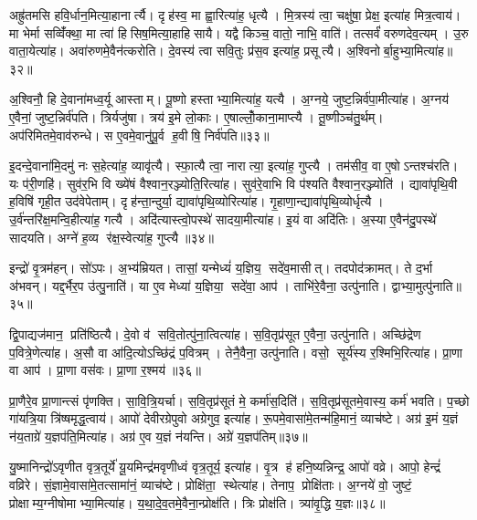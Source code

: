 अह्रु॑तमसि हवि॒र्धान॒मित्या॒हानार्त्यै। दृह॑स्व॒ मा ह्वा॒रित्या॑ह॒ धृत्यै। मि॒त्रस्य॑ त्वा॒ चक्षु॑षा॒ प्रेक्ष॒ इत्या॑ह मित्र॒त्वाय॑। मा भेर्मा सव्विँ॑क्था॒ मा त्वा॑ हिसिष॒मित्या॒हाहिसायै। यद्वै किञ्च॒ वातो॒ नाभि॒ वाति॑। तत्सर्वं॑ वरुणदेव॒त्यम्। उ॒रु वाता॒येत्या॑ह। अवा॑रुणमे॒वैन॑त्करोति। दे॒वस्य॑ त्वा सवि॒तुः प्र॑स॒व इत्या॑ह॒ प्रसूत्यै। अ॒श्विनोर्बा॒हुभ्या॒मित्या॑ह॥३२॥

अ॒श्विनौ॒ हि दे॒वाना॑मध्व॒र्यू आस्ताम्। पू॒ष्णो हस्ताभ्या॒मित्या॑ह॒ यत्यै। अ॒ग्नये॒ जुष्ट॒न्निर्व॑पा॒मीत्या॑ह। अ॒ग्नय॑ ए॒वैनां॒ जुष्ट॒न्निर्व॑पति। त्रिर्यजु॑षा। त्रय॑ इ॒मे लो॒काः। ए॒षाल्लोँ॒काना॒माप्त्यै। तू॒ष्णीञ्च॑तु॒र्थम्। अप॑रिमितमे॒वाव॑रुन्धे। स ए॒वमे॒वानु॑पू॒र्व ह॒वीषि॒ निर्व॑पति॥३३॥

इ॒दन्दे॒वाना॑मि॒दमु॑ नः स॒हेत्या॑ह॒ व्यावृ॑त्यै। स्फा॒त्यै त्वा॒ नारात्या॒ इत्या॑ह॒ गुप्त्यै। तम॑सीव॒ वा ए॒षोऽन्तश्च॑रति। यः प॑री॒णहि॑। सुव॑र॒भि वि ख्ये॑षं वैश्वान॒रञ्ज्योति॒रित्या॑ह। सुव॑रे॒वाभि वि प॑श्यति वैश्वान॒रञ्ज्योति॑। द्यावा॑पृथि॒वी ह॒विषि॑ गृही॒त उद॑वेपेताम्। दृह॑न्ता॒न्दुर्या॒ द्यावा॑पृथि॒व्योरित्या॑ह। गृ॒हाणा॒न्द्यावा॑पृथि॒व्योर्धृत्यै। उ॒र्व॑न्तरि॑क्ष॒मन्वि॒हीत्या॑ह॒ गत्यै। अदि॑त्यास्त्वो॒पस्थे॑ सादया॒मीत्या॑ह। इ॒यं वा अदि॑तिः। अ॒स्या ए॒वैन॑दु॒पस्थे॑ सादयति। अग्ने॑ ह॒व्य र॑क्ष॒स्वेत्या॑ह॒ गुप्त्यै॥३४॥\anuvakamend[य॒ज्ञो वा आपो॒ धाम॑ प्र॒णीय॒ प्रच॑रत्यती॒यादे॒तद्बा॒हुभ्या॒मित्या॑ह ह॒वीषि॒ निर्व॑पति॒ गत्यै॑ च॒त्वारि॑ च]

इन्द्रो॑ वृ॒त्रम॑हन्। सो॑ऽपः। अ॒भ्य॑म्रियत। तासां॒ यन्मेध्यं॑ य॒ज्ञिय॒ सदे॑व॒मासीत्। तदपोद॑क्रामत्। ते द॒र्भा अ॑भवन्। यद्द॒र्भैर॒प उ॑त्पु॒नाति॑। या ए॒व मेध्या॑ य॒ज्ञिया॒ सदे॑वा॒ आप॑। ताभि॑रे॒वैना॒ उत्पु॑नाति। द्वाभ्या॒मुत्पु॑नाति॥३५॥

द्वि॒पाद्यज॑मान॒ प्रति॑ष्ठित्यै। दे॒वो व॑ सवि॒तोत्पु॑ना॒त्वित्या॑ह। स॒वि॒तृप्र॑सूत ए॒वैना॒ उत्पु॑नाति। अच्छि॑द्रेण प॒वित्रे॒णेत्या॑ह। अ॒सौ वा आ॑दि॒त्योऽच्छि॑द्रं प॒वित्रम्। तेनै॒वैना॒ उत्पु॑नाति। वसो॒ सूर्य॑स्य र॒श्मिभि॒रित्या॑ह। प्रा॒णा वा आप॑। प्रा॒णा वस॑वः। प्रा॒णा र॒श्मय॑॥३६॥

प्रा॒णैरे॒व प्रा॒णान्त्सं पृ॑णक्ति। सा॒वि॒त्रि॒यर्चा। स॒वि॒तृप्र॑सूतं मे॒ कर्मा॑स॒दिति॑। स॒वि॒तृप्र॑सूतमे॒वास्य॒ कर्म॑ भवति। प॒च्छो गा॑यत्रि॒या त्रि॑ष्षमृद्ध॒त्वाय॑। आपो॑ देवीरग्रेपुवो अग्रेगुव॒ इत्या॑ह। रू॒पमे॒वासा॑मे॒तन्म॑हि॒मानं॒ व्याच॑ष्टे। अग्र॑ इ॒मं य॒ज्ञं न॑य॒ताग्रे॑ य॒ज्ञप॑ति॒मित्या॑ह। अग्र॑ ए॒व य॒ज्ञं न॑यन्ति। अग्रे॑ य॒ज्ञप॑तिम्॥३७॥

यु॒ष्मानिन्द्रो॑ऽवृणीत वृत्र॒तूर्ये॑ यू॒यमिन्द्र॑मवृणीध्वं वृत्र॒तूर्य॒ इत्या॑ह। वृ॒त्र ह॑ हनि॒ष्यन्निन्द्र॒ आपो॑ वव्रे। आपो॒ हेन्द्रं॑ वव्रिरे। सं॒ज्ञामे॒वासा॑मे॒तत्सामा॑नं॒ व्याच॑ष्टे। प्रोक्षि॑ता॒ स्थेत्या॑ह। तेनाप॒ प्रोक्षि॑ताः। अ॒ग्नये॑ वो॒ जुष्टं॒ प्रोक्षाम्य॒ग्नीषोमाभ्या॒मित्या॑ह। य॒था॒दे॒व॒तमे॒वैना॒न्प्रोक्ष॑ति। त्रिः प्रोक्ष॑ति। त्र्या॑वृ॒द्धि य॒ज्ञः॥३८॥

